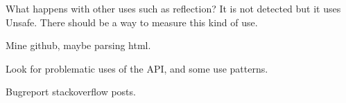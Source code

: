 
What happens with other uses such as reflection? It is not detected but it uses Unsafe. There should be a way to measure this kind of use.

Mine github, maybe parsing html.

Look for problematic uses of the API, and some use patterns.

Bugreport stackoverflow posts.